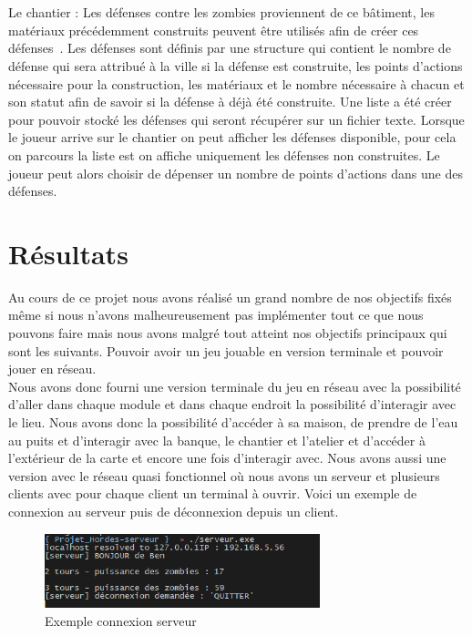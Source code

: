 \documentclass[a4paper,11pt]{article}
\begin{document}
\\
\\
Le chantier : Les défenses contre les zombies proviennent de ce bâtiment, les matériaux précédemment construits peuvent être utilisés afin de créer ces défenses . Les défenses sont définis par une structure qui contient le nombre de défense qui sera attribué à la ville si la défense est construite, les points d'actions nécessaire pour la construction, les matériaux et le nombre nécessaire à chacun et son statut afin de savoir si la défense à déjà été construite. Une liste a été créer pour pouvoir stocké les défenses qui seront  récupérer sur un fichier texte. Lorsque le joueur arrive sur le chantier on peut afficher les défenses disponible, pour cela on parcours la liste est on affiche uniquement les défenses non construites. Le joueur peut alors choisir de dépenser un nombre de points d'actions dans une des défenses. 

\newpage

\section{Résultats}
Au cours de ce projet nous avons réalisé un grand nombre de nos objectifs fixés même si nous n’avons malheureusement pas implémenter tout ce que nous pouvons faire mais nous avons malgré tout atteint nos objectifs principaux qui sont les suivants. Pouvoir avoir un jeu jouable en version terminale et pouvoir jouer en réseau.
\\

Nous avons donc fourni une version terminale du jeu en réseau avec la possibilité d’aller dans chaque module et dans chaque endroit la possibilité d’interagir avec le lieu. Nous avons donc la possibilité d’accéder à sa maison, de prendre de l’eau au puits et d’interagir avec la banque, le chantier et l’atelier et d’accéder à l’extérieur de la carte et encore une fois d’interagir avec. Nous avons aussi une version avec le réseau quasi fonctionnel où nous avons un serveur et plusieurs clients avec pour chaque client un terminal à ouvrir.  
Voici un exemple de connexion au serveur puis de déconnexion depuis un client.
\\
\begin{figure}[h]
    \begin{center}
    \includegraphics[width=8cm] {res1.png}
    \caption{Exemple connexion serveur}
    \label{serveur}
    \end{center}
\end{figure}
\end{document}
